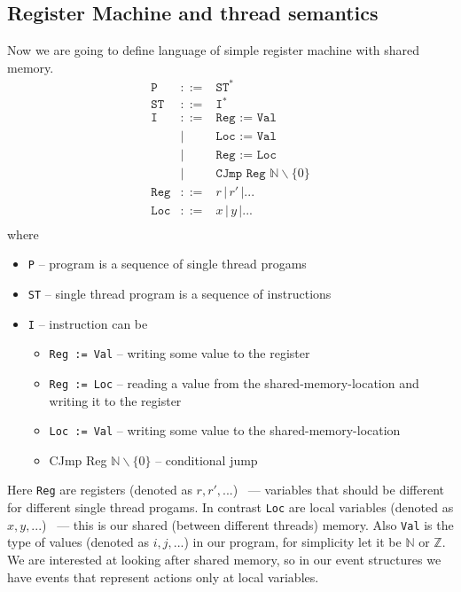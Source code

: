 \subsection{Register Machine and thread semantics}
Now we are going to define language of simple register machine with shared memory.
\[
\begin{array}{rcll}
  \texttt{P} &::=& \texttt{ST}^* \\
  \texttt{ST} & ::= & \texttt{I}^* \\
  \texttt{I} & ::= & \texttt{Reg := Val} \\
                 & | & \texttt{Loc := Val} \\
                 & | & \texttt{Reg := Loc} \\
                 & | & \texttt{CJmp Reg $\mathbb{N} \backslash \{0\}$} \\
  \texttt{Reg}            & ::= & r \, | \, r' \, | ... \\ 
  \texttt{Loc}            & ::= & x \, | \,y \,| ... \\ 
\end{array}
\] where
\begin{itemize}
  \item \texttt{P} -- program is a sequence of single thread progams
  \item \texttt{ST} -- single thread program is a sequence of instructions
  \item \texttt{I} -- instruction can be 
  \begin{itemize}
    \item \texttt{Reg := Val} -- writing some value to the register
    \item \texttt{Reg := Loc} -- reading a value from the shared-memory-location and writing it to the register
    \item \texttt{Loc := Val} -- writing some value to the shared-memory-location
    \item CJmp Reg $\mathbb{N} \backslash \{0\}$ -- conditional jump
  \end{itemize}
\end{itemize}
Here \texttt{Reg} are registers (denoted as $r,r',...$) ~--- variables that should be different for different single thread progams. In contrast \texttt{Loc} are local variables (denoted as $x,y,...$) ~--- this is our shared (between different threads) memory. Also \texttt{Val} is the type of values (denoted as $i,j,...$) in our program, for simplicity let it be $\mathbb{N}$ or $\mathbb{Z}$. \\
We are interested at looking after shared memory, so in our event structures we have events that represent actions only at local variables. \\

